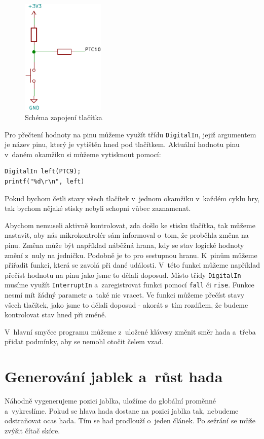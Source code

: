 \documentclass[12pt]{article}
\begin{document}
\begin{figure}[ht]
\centering
  \includegraphics[width=4cm]{figures/button}
\caption{Schéma zapojení tlačítka}
 \label{fig:button}
\end{figure}
\FloatBarrier

Pro přečtení hodnoty na pinu můžeme využít třídu \texttt{DigitalIn}, jejiž argumentem je název pinu, který je vytištěn hned pod tlačítkem.
Aktuální hodnotu pinu v~daném okamžiku si můžeme vytisknout pomocí:
\begin{verbatim}
DigitalIn left(PTC9);
printf("%d\r\n", left)
\end{verbatim}

Pokud bychom četli stavy všech tlačítek v~jednom okamžiku v~každém cyklu hry, tak bychom nějaké stisky nebyli schopni vůbec zaznamenat. 

Abychom nemuseli aktivně kontrolovat, zda došlo ke stisku tlačítka, tak můžeme nastavit, aby nás mikrokontrolér sám informoval o~tom, že proběhla změna na pinu.
Změna může být například náběžná hrana, kdy se stav logické hodnoty změní z~nuly na jedničku.
Podobně je to pro sestupnou hranu.
K~pinům můžeme přiřadit funkci, která se zavolá při dané události.
V~této funkci můžeme například přečíst hodnotu na pinu jako jsme to dělali doposud.
Místo třídy \texttt{DigitalIn} musíme využít \texttt{InterruptIn} a~zaregistrovat funkci pomocí \texttt{fall} či \texttt{rise}.
Funkce nesmí mít žádný parametr a~také nic vracet.
Ve funkci můžeme přečíst stavy všech tlačítek, jako jsme to dělali doposud - akorát s~tím rozdílem, že budeme kontrolovat stav hned při změně.

V~hlavní smyčce programu můžeme z~uložené klávesy změnit směr hada a~třeba přidat podmínky, aby se nemohl otočit čelem vzad.

\section{Generování jablek a~růst hada}
Náhodně vygenerujeme pozici jablka, uložíme do globální proměnné a~vykreslíme.
Pokud se hlava hada dostane na pozici jablka tak, nebudeme odstraňovat ocas hada.
Tím se had prodlouží o~jeden článek.
Po sežrání se může zvýšit čítač skóre.
\end{document}
